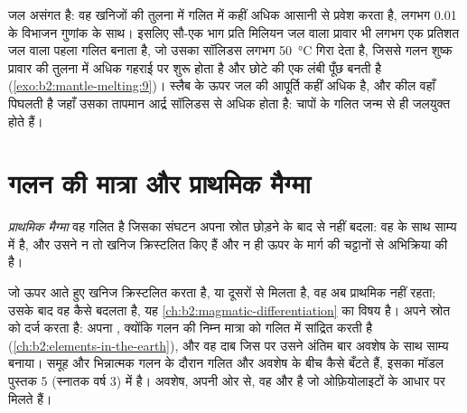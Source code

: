 जल असंगत है: वह खनिजों की तुलना में गलित में कहीं अधिक आसानी से प्रवेश करता है,
लगभग 0.01 के विभाजन गुणांक के साथ। इसलिए सौ-एक
भाग प्रति मिलियन जल वाला प्रावार भी लगभग एक प्रतिशत जल वाला पहला गलित बनाता है,
जो उसका सॉलिडस लगभग \qty{50}{\celsius} गिरा देता है, जिससे गलन
शुष्क प्रावार की तुलना में अधिक गहराई पर शुरू होता है और छोटे  की एक लंबी पूँछ बनती है
(\cref{exo:b2:mantle-melting:9})। स्लैब के ऊपर जल की आपूर्ति कहीं अधिक है, और कील
वहाँ पिघलती है जहाँ उसका तापमान आर्द्र सॉलिडस से अधिक होता है: चापों के गलित जन्म से ही
जलयुक्त होते हैं।

\section{गलन की मात्रा और प्राथमिक मैग्मा}\label{sec:b2:mantle-melting:primary}

\begin{definition}[प्राथमिक मैग्मा]\label{def:b2:mantle-melting:primary}
\emph{प्राथमिक मैग्मा} वह गलित है जिसका संघटन अपना
स्रोत छोड़ने के बाद से नहीं बदला: वह  के साथ साम्य में है,
और उसने न तो खनिज क्रिस्टलित किए हैं और न ही ऊपर के मार्ग की चट्टानों से अभिक्रिया की है।
\end{definition}

जो  ऊपर आते हुए खनिज क्रिस्टलित करता है, या दूसरों से मिलता है, वह अब
प्राथमिक नहीं रहता; उसके बाद वह कैसे बदलता है, यह
\cref{ch:b2:magmatic-differentiation} का विषय है।  अपने स्रोत को दर्ज करता है: अपना
, क्योंकि गलन की निम्न मात्रा  को
गलित में सांद्रित करती है (\cref{ch:b2:elements-in-the-earth}), और वह दाब जिस पर उसने अंतिम बार
अवशेष के साथ साम्य बनाया। समूह और भिन्नात्मक गलन के दौरान  गलित और
अवशेष के बीच कैसे बँटते हैं, इसका मॉडल पुस्तक 5 (स्नातक वर्ष 3) में है।
अवशेष, अपनी ओर से, वह  और  है जो
ओफ़ियोलाइटों के आधार पर मिलते हैं।

